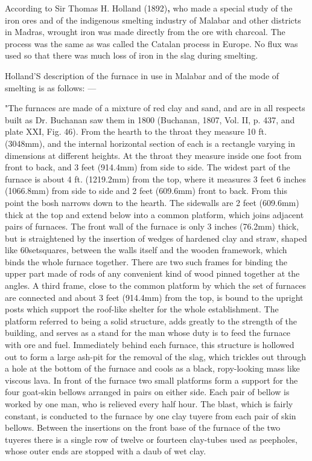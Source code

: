 According to Sir Thomas H. Holland (1892)\textbf{,} who made a special study of the iron ores and of the indigenous smelting industry of Malabar and other districts in Madras, wrought iron was made directly from the ore with charcoal. The process was the same as was called the Catalan process in Europe. No flux was used so that there was much loss of iron in the slag during smelting.

Holland’S description of the furnace in use in Malabar and of the mode of smelting is as follows: —

"The furnaces are made of a mixture of red clay and sand, and are in all respects built as Dr. Buchanan saw them in 1800 (Buchanan, 1807, Vol. II, p. 437, and plate XXI, Fig. 46). From the hearth to the throat they measure 10 ft. (3048mm), and the internal horizontal section of each is a rectangle varying in dimensions at different heights. At the throat they measure inside one foot from front to back, and 3 feet (914.4mm) from side to side. The widest part of the furnace is about 4 ft. (1219.2mm) from the top, where it measures 3 feet 6 inches (1066.8mm) from side to side and 2 feet (609.6mm) front to back. From this point the bosh narrows down to the hearth. The sidewalls are 2 feet (609.6mm) thick at the top and extend below into a common platform, which joins adjacent pairs of furnaces. The front wall of the furnace is only 3 inches (76.2mm) thick, but is straightened by the insertion of wedges of hardened clay and straw, shaped like 60\circ setsquares, between the walls itself and the wooden framework, which binds the whole furnace together. There are two such frames for binding the upper part made of rods of any convenient kind of wood pinned together at the angles. A third frame, close to the common platform by which the set of furnaces are connected and about 3 feet (914.4mm) from the top, is bound to the upright posts which support the roof-like shelter for the whole establishment. The platform referred to being a solid structure, adds greatly to the strength of the building, and serves as a stand for the man whose duty is to feed the furnace with ore and fuel. Immediately behind each furnace, this structure is hollowed out to form a large ash-pit for the removal of the slag, which trickles out through a hole at the bottom of the furnace and cools as a black, ropy-looking mass like viscous lava. In front of the furnace two small platforms form a support for the four goat-skin bellows arranged in pairs on either side. Each pair of bellow is worked by one man, who is relieved every half hour. The blast, which is fairly constant, is conducted to the furnace by one clay tuyere from each pair of skin bellows. Between the insertions on the front base of the furnace of the two tuyeres there is a single row of twelve or fourteen clay-tubes used as peepholes, whose outer ends are stopped with a daub of wet clay.

